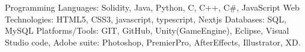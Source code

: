 


  \begin{cvskills}
    \cvskill
      {Programming Languages:}
      {Solidity, Java, Python, C, C++, C\#, JavaScript}
     \cvskill
       {Web Technologies:}  
        {HTML5, CSS3, javascript, typescript, Nextjs}
     \cvskill
        {Databases:}  
        {SQL, MySQL}
      \cvskill
         {Platforms/Tools:}  
         {GIT, GitHub, Unity(GameEngine), Eclipse, Visual Studio code, \newline Adobe suite: Photoshop, PremierPro, AfterEffects, Illustrator, XD.}
      
     \end{cvskills}
    
\begin{cvparagraph}


\end{cvparagraph}
